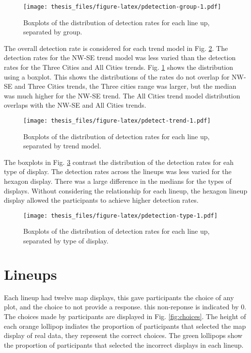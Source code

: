 \documentclass{monashthesis}
\begin{document}
\begin{figure}
\centering
\texttt{[image: thesis\_files/figure-latex/pdetection-group-1.pdf]}
\caption{\label{fig:pdetection-group}Boxplots of the distribution of detection rates for each line up, separated by group.}
\end{figure}

The overall detection rate is considered for each trend model in Fig. \ref{fig:pdetect-trend}.
The detection rates for the NW-SE trend model was less varied than the detection rates for the Three Cities and All Cities trends. Fig. \ref{fig:pdetection-group} shows the distribution using a boxplot. This shows the distributions of the rates do not overlap for NW-SE and Three Cities trends, the Three cities range was larger, but the median was much higher for the NW-SE trend. The All Cities trend model distribution overlaps with the NW-SE and All Cities trends.

\begin{figure}
\centering
\texttt{[image: thesis\_files/figure-latex/pdetect-trend-1.pdf]}
\caption{\label{fig:pdetect-trend}Boxplots of the distribution of detection rates for each line up, separated by trend model.}
\end{figure}

The boxplots in Fig. \ref{fig:pdetection-type} contrast the distribution of the detection rates for eah type of display.
The detection rates across the lineups was less varied for the hexagon display. There was a large difference in the medians for the types of displays.
Without considering the relationship for each lineup, the hexagon lineup display allowed the participants to achieve higher detection rates.

\begin{figure}
\centering
\texttt{[image: thesis\_files/figure-latex/pdetection-type-1.pdf]}
\caption{\label{fig:pdetection-type}Boxplots of the distribution of detection rates for each line up, separated by type of display.}
\end{figure}

\hypertarget{lineups}{%
\section{Lineups}\label{lineups}}

Each lineup had twelve map displays, this gave participants the choice of any plot, and the choice to not provide a response. this non-reponse is indicated by 0.
The choices made by participants are displayed in Fig. \ref{fig:choices}. The height of each orange lollipop indiates the proportion of participants that selected the map display of real data, they represent the correct choices.
The green lollipops show the proportion of participants that selected the incorrect displays in each lineup.
\end{document}
